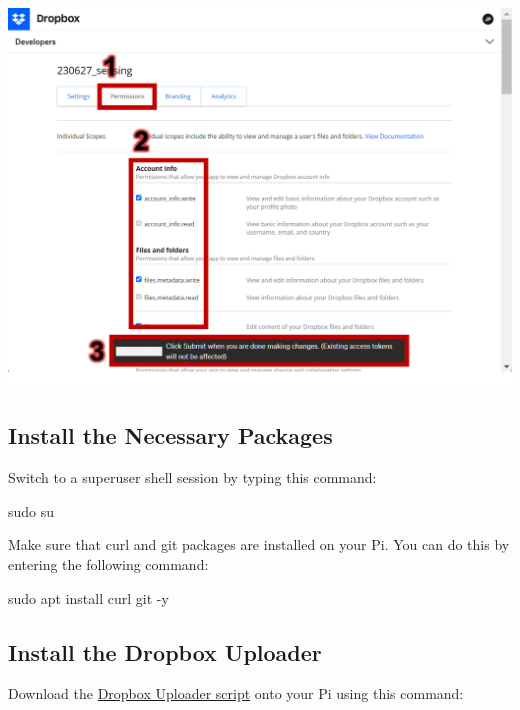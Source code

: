 \documentclass[
  letterpaper,
]{scrbook}
\newenvironment{Shaded}{\begin{snugshade}}{\end{snugshade}}
\newcommand{\AttributeTok}[1]{\textcolor[rgb]{0.40,0.45,0.13}{#1}}
\newcommand{\FunctionTok}[1]{\textcolor[rgb]{0.28,0.35,0.67}{#1}}
\newcommand{\NormalTok}[1]{\textcolor[rgb]{0.00,0.23,0.31}{#1}}
\begin{document}
\includegraphics{content/material/ch2/dropbox_permission.png}

\hypertarget{install-the-necessary-packages}{%
\subsection{Install the Necessary
Packages}\label{install-the-necessary-packages}}

Switch to a superuser shell session by typing this command:

\begin{Shaded}
\begin{Highlighting}[]
\FunctionTok{sudo}\NormalTok{ su}
\end{Highlighting}
\end{Shaded}

Make sure that curl and git packages are installed on your Pi. You can
do this by entering the following command:

\begin{Shaded}
\begin{Highlighting}[]
\FunctionTok{sudo}\NormalTok{ apt install curl git }\AttributeTok{{-}y}
\end{Highlighting}
\end{Shaded}

\hypertarget{install-the-dropbox-uploader}{%
\subsection{Install the Dropbox
Uploader}\label{install-the-dropbox-uploader}}

Download the
\href{https://github.com/andreafabrizi/Dropbox-Uploader/}{Dropbox
Uploader script} onto your Pi using this command:
\end{document}
